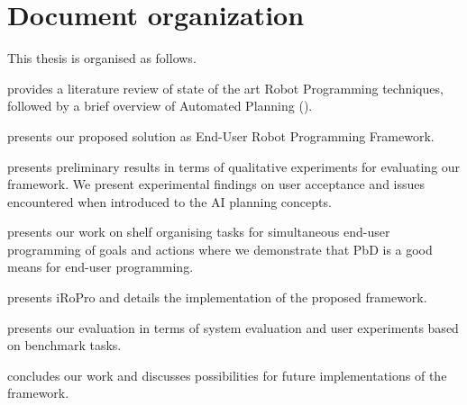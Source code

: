 \section{Document organization}
This thesis is organised as follows. 

\textbf{} provides a literature review of state of the art Robot Programming techniques, followed by a brief overview of Automated Planning (\textbf{}).

\textbf{} presents our proposed solution as End-User Robot Programming Framework.

\textbf{} presents preliminary results in terms of qualitative experiments for evaluating our framework. We present experimental findings on user acceptance and issues encountered when introduced to the AI planning concepts.

\textbf{} presents our work on shelf organising tasks for simultaneous end-user programming of goals and actions where we demonstrate that PbD is a good means for end-user programming.

\textbf{} presents iRoPro and details the implementation of the proposed framework. 

\textbf{} presents our evaluation in terms of system evaluation and user experiments based on benchmark tasks.

\textbf{} concludes our work and discusses possibilities for future implementations of the framework.

%


